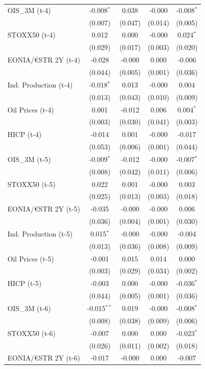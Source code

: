 \begin{longtable}[t]{lcccc}
OIS\_3M (t-4) & -0.008$^{*}$ & 0.038 & -0.000 & -0.008$^{*}$\\
 & (0.007) & (0.047) & (0.014) & (0.005)\\
STOXX50 (t-4) & 0.012 & 0.000 & -0.000 & 0.024$^{*}$\\
 & (0.029) & (0.017) & (0.003) & (0.020)\\
EONIA/€STR 2Y (t-4) & -0.028 & -0.000 & 0.000 & -0.006\\
 & (0.044) & (0.005) & (0.001) & \vphantom{1} (0.036)\\
Ind. Production (t-4) & -0.018$^{*}$ & 0.013 & -0.000 & 0.004\\
 & (0.013) & (0.043) & (0.010) & (0.009)\\
Oil Prices (t-4) & 0.001 & -0.012 & 0.006 & 0.004$^{*}$\\
 & (0.003) & (0.030) & (0.041) & (0.003)\\
HICP (t-4) & -0.014 & 0.001 & -0.000 & -0.017\\
 & (0.053) & (0.006) & (0.001) & (0.044)\\
OIS\_3M (t-5) & -0.009$^{*}$ & -0.012 & -0.000 & -0.007$^{*}$\\
 & (0.008) & (0.042) & (0.011) & (0.006)\\
STOXX50 (t-5) & 0.022 & 0.001 & -0.000 & 0.003\\
 & (0.025) & (0.013) & (0.003) & (0.018)\\
EONIA/€STR 2Y (t-5) & -0.035 & -0.000 & -0.000 & 0.006\\
 & (0.036) & (0.004) & (0.001) & (0.030)\\
Ind. Production (t-5) & 0.015$^{*}$ & -0.000 & -0.000 & -0.004\\
 & (0.013) & (0.036) & (0.008) & (0.009)\\
Oil Prices (t-5) & -0.001 & 0.015 & 0.014 & 0.000\\
 & (0.003) & (0.029) & (0.034) & (0.002)\\
HICP (t-5) & -0.003 & 0.000 & -0.000 & -0.036$^{*}$\\
 & (0.044) & (0.005) & (0.001) & (0.036)\\
OIS\_3M (t-6) & -0.015$^{**}$ & 0.019 & -0.000 & -0.008$^{*}$\\
 & (0.008) & (0.038) & (0.009) & (0.006)\\
STOXX50 (t-6) & -0.007 & 0.000 & 0.000 & -0.023$^{*}$\\
 & (0.026) & (0.011) & (0.002) & (0.018)\\
EONIA/€STR 2Y (t-6) & -0.017 & -0.000 & 0.000 & -0.007\\

\end{longtable}
